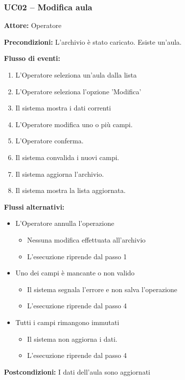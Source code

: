 \documentclass[a4paper,11pt]{article}
\begin{document}
\begin{samepage}
\subsubsection*{UC02 -- Modifica aula}
\begin{ucbox}

\noindent\textbf{Attore:} Operatore\par
\noindent\textbf{Precondizioni:} L'archivio è stato caricato. Esiste un'aula.\par

\noindent\textbf{Flusso di eventi:}
\begin{enumerate}
\item L'Operatore seleziona un'aula dalla lista \item L'Operatore seleziona l'opzione 'Modifica' \item Il sistema mostra i dati correnti \item L'Operatore modifica uno o più campi. \item L'Operatore conferma. \item Il sistema convalida i nuovi campi. \item Il sistema aggiorna l'archivio. \item Il sistema mostra la lista aggiornata. \end{enumerate}
\noindent\textbf{Flussi alternativi:}
\begin{itemize}
\item[5a.] L'Operatore annulla l'operazione
\begin{itemize}
\item Nessuna modifica effettuata all'archivio
\item L'esecuzione riprende dal passo 1
\end{itemize}
\item[6a.] Uno dei campi è mancante o non valido
\begin{itemize}
\item Il sistema segnala l'errore e non salva l'operazione
\item L'esecuzione riprende dal passo 4
\end{itemize}
\item[6b.] Tutti i campi rimangono immutati
\begin{itemize}
\item Il sistema non aggiorna i dati.
\item L'esecuzione riprende dal passo 4
\end{itemize}
\end{itemize}
\noindent\textbf{Postcondizioni:} I dati dell'aula sono aggiornati\par
\end{ucbox}
\end{samepage}
\end{document}
